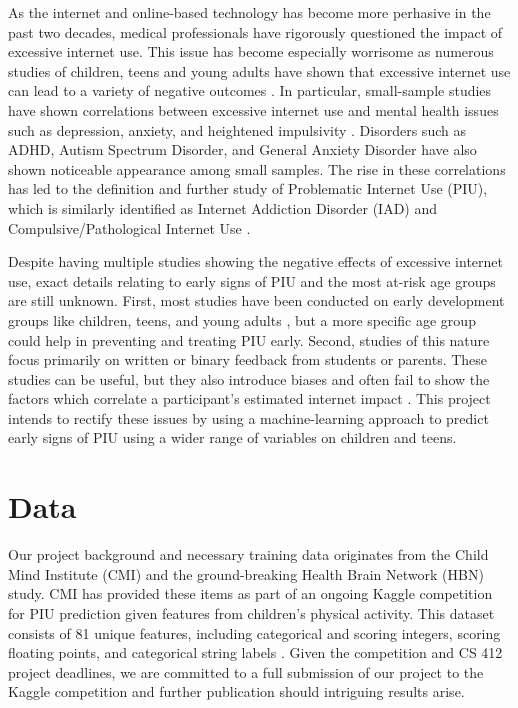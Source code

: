 \documentclass[12pt]{extarticle}
\begin{document}
As the internet and online-based technology has become more perhasive in the past two decades, medical professionals have rigorously questioned the impact of excessive internet use.
This issue has become especially worrisome as numerous studies of children, teens and young adults have shown that excessive internet use can lead to a variety of negative outcomes \cite{Pettorruso2020-qt,Cash2012-rb,Aboujaoude2010-mc,Restrepo2020-pb}.
In particular, small-sample studies have shown correlations between excessive internet use and mental health issues such as depression, anxiety, and heightened impulsivity \cite{Cash2012-rb}.
Disorders such as ADHD, Autism Spectrum Disorder, and General Anxiety Disorder have also shown noticeable appearance among small samples\cite{Restrepo2020-pb}. 
The rise in these correlations has led to the definition and further study of Problematic Internet Use (PIU), which is similarly identified as Internet Addiction Disorder (IAD) and Compulsive/Pathological Internet Use \cite{Restrepo2020-pb}.

Despite having multiple studies showing the negative effects of excessive internet use, exact details relating to early signs of PIU and the most at-risk age groups are still unknown.
First, most studies have been conducted on early development groups like children, teens, and young adults \cite{Pettorruso2020-qt,Cash2012-rb,Aboujaoude2010-mc,Restrepo2020-pb}, but a more specific age group could help in preventing and treating PIU early.
Second, studies of this nature focus primarily on written or binary feedback from students or parents. 
These studies can be useful, but they also introduce biases and often fail to show the factors which correlate a participant's estimated internet impact \cite{Restrepo2020-pb,Aboujaoude2010-mc}.
This project intends to rectify these issues by using a machine-learning approach to predict early signs of PIU using a wider range of variables on children and teens.

\section{Data}

Our project background and necessary training data originates from the Child Mind Institute (CMI) and the ground-breaking Health Brain Network (HBN) study.
CMI has provided these items as part of an ongoing Kaggle competition for PIU prediction given features from children's physical activity. 
This dataset consists of 81 unique features, including categorical and scoring integers, scoring floating points, and categorical string labels \cite{child-mind-institute-problematic-internet-use}.
Given the competition and CS 412 project deadlines, we are committed to a full submission of our project to the Kaggle competition and further publication should intriguing results arise.
\end{document}
